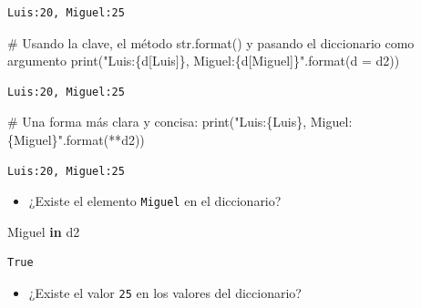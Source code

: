 \documentclass[
  spanish,
  letterpaper,
]{scrbook}
\newenvironment{Shaded}{\begin{snugshade}}{\end{snugshade}}
\newcommand{\BuiltInTok}[1]{\textcolor[rgb]{0.00,0.23,0.31}{#1}}
\newcommand{\CommentTok}[1]{\textcolor[rgb]{0.37,0.37,0.37}{#1}}
\newcommand{\KeywordTok}[1]{\textcolor[rgb]{0.00,0.23,0.31}{\textbf{#1}}}
\newcommand{\NormalTok}[1]{\textcolor[rgb]{0.00,0.23,0.31}{#1}}
\newcommand{\OperatorTok}[1]{\textcolor[rgb]{0.37,0.37,0.37}{#1}}
\newcommand{\SpecialCharTok}[1]{\textcolor[rgb]{0.37,0.37,0.37}{#1}}
\newcommand{\StringTok}[1]{\textcolor[rgb]{0.13,0.47,0.30}{#1}}
\providecommand{\tightlist}{%
  \setlength{\itemsep}{0pt}\setlength{\parskip}{0pt}}
\theoremstyle{definition}
\theoremstyle{remark}
\begin{document}
\begin{verbatim}
Luis:20, Miguel:25
\end{verbatim}

\begin{Shaded}
\begin{Highlighting}[]
\CommentTok{\# Usando la clave, el método str.format() y pasando el diccionario como argumento}
\BuiltInTok{print}\NormalTok{(}\StringTok{"Luis:}\SpecialCharTok{\{d[Luis]\}}\StringTok{, Miguel:}\SpecialCharTok{\{d[Miguel]\}}\StringTok{"}\NormalTok{.}\BuiltInTok{format}\NormalTok{(d }\OperatorTok{=}\NormalTok{ d2))}
\end{Highlighting}
\end{Shaded}

\begin{verbatim}
Luis:20, Miguel:25
\end{verbatim}

\begin{Shaded}
\begin{Highlighting}[]
\CommentTok{\# Una forma más clara y concisa:}
\BuiltInTok{print}\NormalTok{(}\StringTok{"Luis:}\SpecialCharTok{\{Luis\}}\StringTok{, Miguel:}\SpecialCharTok{\{Miguel\}}\StringTok{"}\NormalTok{.}\BuiltInTok{format}\NormalTok{(}\OperatorTok{**}\NormalTok{d2))}
\end{Highlighting}
\end{Shaded}

\begin{verbatim}
Luis:20, Miguel:25
\end{verbatim}

\begin{itemize}
\tightlist
\item
  ¿Existe el elemento
  \texttt{\textquotesingle{}Miguel\textquotesingle{}} en el diccionario?
\end{itemize}

\begin{Shaded}
\begin{Highlighting}[]
\CommentTok{\textquotesingle{}Miguel\textquotesingle{}} \KeywordTok{in}\NormalTok{ d2}
\end{Highlighting}
\end{Shaded}

\begin{verbatim}
True
\end{verbatim}

\begin{itemize}
\tightlist
\item
  ¿Existe el valor \texttt{25} en los valores del diccionario?
\end{itemize}
\end{document}
